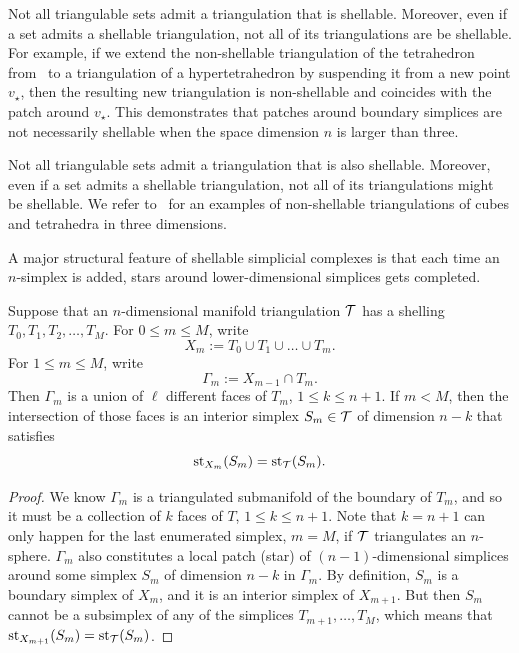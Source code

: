 \documentclass[10pt,a4paper]{article}
\begin{document}
\begin{remark}
    Not all triangulable sets admit a triangulation that is shellable. 
    Moreover, even if a set admits a shellable triangulation, not all of its triangulations are be shellable. For example, if we extend the non-shellable triangulation of the tetrahedron from~\cite[Example 8.9]{ziegler1995lectures} to a triangulation of a hypertetrahedron by suspending it from a new point $v_\star$, then the resulting new triangulation is non-shellable and coincides with the patch around $v_\star$.
    This demonstrates that patches around boundary simplices are not necessarily shellable when the space dimension $n$ is larger than three.
\end{remark}
\begin{remark}
    Not all triangulable sets admit a triangulation that is also shellable. 
    Moreover, even if a set admits a shellable triangulation, not all of its triangulations might be shellable. 
    We refer to~\cite[Example 8.9]{ziegler1995lectures} for an examples of non-shellable triangulations of cubes and tetrahedra in three dimensions. 
\end{remark}


A major structural feature of shellable simplicial complexes is that each time an $n$-simplex is added, stars around lower-dimensional simplices gets completed. 

\begin{lemma}\label{lemma:existenceofstar}
    Suppose that an $n$-dimensional manifold triangulation ${\mathcal T}$ has a shelling $T_{0}, T_{1}, T_{2}, \dots, T_{M}$.
    For $0 \leq m \leq M$, write 
    $$
        X_{m} := T_{0} \cup T_{1} \cup \dots \cup T_{m}.
    $$ 
    For $1 \leq m \leq M$, write 
    $$
        \Gamma_{m} := X_{m-1} \cap T_{m}.
    $$ 
    Then $\Gamma_{m}$ is a union of $\ell$ different faces of $T_{m}$, $1 \leq k \leq n+1$.
    If $m < M$, then the intersection of those faces is an interior simplex $S_{m} \in {\mathcal T}$ of dimension $n-k$ that satisfies 
    $$
        \operatorname{st}_{X_{m}}(S_{m}) = \operatorname{st}_{{\mathcal T}}(S_{m}).
    $$
\end{lemma}
\begin{proof}
    We know $\Gamma_{m}$ is a triangulated submanifold of the boundary of $T_{m}$, 
    and so it must be a collection of $k$ faces of $T$, $1 \leq k \leq n+1$.
    Note that $k = n + 1$ can only happen for the last enumerated simplex, $m = M$, if ${\mathcal T}$ triangulates an $n$-sphere. 
    $\Gamma_{m}$ also constitutes a local patch (star) of $(n-1)$-dimensional simplices around some simplex $S_{m}$ of dimension $n-k$ in $\Gamma_{m}$.
    By definition, $S_{m}$ is a boundary simplex of $X_{m}$, 
    and it is an interior simplex of $X_{m+1}$. 
    But then $S_{m}$ cannot be a subsimplex of any of the simplices $T_{m+1}, \dots, T_{M}$,
    which means that $\operatorname{st}_{X_{m+1}}(S_{m}) = \operatorname{st}_{{\mathcal T}}(S_{m})$. 
\end{proof}
\end{document}
